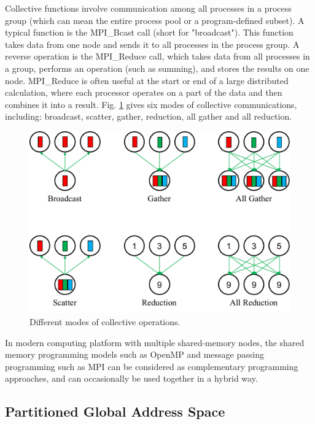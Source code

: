 Collective functions involve communication among all processes in a process group (which can mean the entire process pool or a program-defined subset). A typical function is the MPI\_Bcast call (short for "broadcast"). This function takes data from one node and sends it to all processes in the process group. A reverse operation is the MPI\_Reduce call, which takes data from all processes in a group, performs an operation (such as summing), and stores the results on one node. MPI\_Reduce is often useful at the start or end of a large distributed calculation, where each processor operates on a part of the data and then combines it into a result. Fig. \ref{mpi_collective} gives six modes of collective communications, including: broadcast, scatter, gather, reduction, all gather and all reduction.

\begin{figure}[htbp]
	\centering
	\includegraphics[width=6.in]{fig/collective.pdf}
	\caption{Different modes of collective operations.}
	\label{mpi_collective}
\end{figure}

In modern computing platform with multiple shared-memory nodes, the shared memory programming models such as OpenMP and message passing programming such as MPI can be considered as complementary programming approaches, and can occasionally be used together in a hybrid way.

\subsection{Partitioned Global Address Space}

